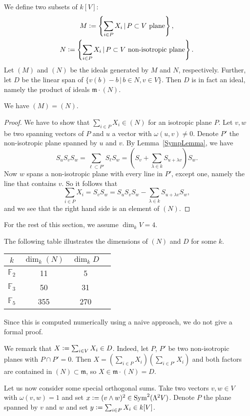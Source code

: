 \begin{definition} \label{SymplecticIdeal}
We define two subsets of $k[V]$:
\begin{gather*}
M \vcentcolon=  \left\{\sum_{i\in P}X_i \,|\, P\subset V \text{ plane}\right\}, \\
N  \vcentcolon=  \left\{\sum_{i\in P}X_i \,|\, P\subset V \text{ non-isotropic plane}\right\}.
\end{gather*}
Let $(M)$ and $(N)$ be the ideals generated by $M$ and $N$, respectively. 
Further, let $D$ be the linear span of $\{v(b) - b \,|\, b\in N, v\in V \}$. Then $D$ is in fact an ideal, namely the product of ideals $\mathfrak m\cdot (N)$.
\end{definition}
\begin{proposition}
We have $(M)=(N)$.
\end{proposition}
\begin{proof}
We have to show that $\sum_{i\in P}X_i \in (N)$ for an isotropic plane $P$. Let $v,w$ be two spanning vectors of $P$ and $u$ a vector with $\omega(u,v)\neq 0$. Denote $P'$ the non-isotropic plane spanned by $u $ and $v$. By Lemma~\ref{SympLemma}, we have
$$
S_uS_vS_w = \sum_{\ell\subset P'} S_{\ell}S_w= \left(S_v+\sum_{\lambda\in k}S_{u + \lambda v}\right)S_w.
$$
Now $w$ spans a non-isotropic plane with every line in $P'$, except one, namely the line that contains $v$. So it follows that
$$
\sum_{i\in P}X_i = S_vS_w = S_uS_vS_w  - \sum_{\lambda\in k} S_{u + \lambda v}S_w, 
$$
and we see that the right hand side is an element of $(N)$.
\end{proof}
For the rest of this section, we assume $\dim_k V=4$. 
\begin{proposition} \label{SymplecticIdealsDimension}
The following table illustrates the dimensions of $(N)$ and $D$ for some $k$.
\vspace{2mm}
\begin{center}
\begin{tabular}{c||c|c|c}
 $k$ & $\dim_k(N)$ & $\dim_k D$ \\
\hline
$\mathbb F_2$   & 11 &  5  \\
$\mathbb F_3$  & 50 & 31  \\
$\mathbb F_5$  &355 &270
\end{tabular}
\end{center}
\end{proposition}
Since this is computed numerically using a naive approach, we do not give a formal proof.
\begin{rmk}\label{c2}
We remark that $X\vcentcolon= \sum_{i\in V}X_i\in D$. Indeed, let $P$, $P'$ be two non-isotropic planes with $P \cap P' = 0$. Then $X = \left( \sum_{i\in P}X_i\right)\left(  \sum_{i\in P'}X_i \right)$ and both factors are contained in $(N)\subset \mathfrak m$, so $X\in \mathfrak m \cdot (N) = D$.
\end{rmk}
Let us now consider some special orthogonal sums. Take two vectors $v,w\in V$ with $\omega(v,w)=1$ and set $x\vcentcolon=  (v\wedge w)^2\in \operatorname{Sym}^2 (\Lambda^2V)$. Denote $P$ the plane spanned by $v$ and $w$ and set $y\vcentcolon=  \sum_{i\in P}X_i\in  k[V]$.


